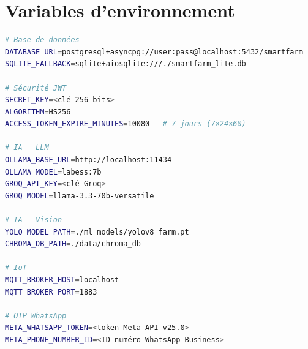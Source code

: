 \chapter{Variables d'environnement}
\label{ann:envvars}

\begin{lstlisting}[language=bash, caption={Variables d'environnement backend (.env)}]
# Base de données
DATABASE_URL=postgresql+asyncpg://user:pass@localhost:5432/smartfarm
SQLITE_FALLBACK=sqlite+aiosqlite:///./smartfarm_lite.db

# Sécurité JWT
SECRET_KEY=<clé 256 bits>
ALGORITHM=HS256
ACCESS_TOKEN_EXPIRE_MINUTES=10080   # 7 jours (7×24×60)

# IA - LLM
OLLAMA_BASE_URL=http://localhost:11434
OLLAMA_MODEL=labess:7b
GROQ_API_KEY=<clé Groq>
GROQ_MODEL=llama-3.3-70b-versatile

# IA - Vision
YOLO_MODEL_PATH=./ml_models/yolov8_farm.pt
CHROMA_DB_PATH=./data/chroma_db

# IoT
MQTT_BROKER_HOST=localhost
MQTT_BROKER_PORT=1883

# OTP WhatsApp
META_WHATSAPP_TOKEN=<token Meta API v25.0>
META_PHONE_NUMBER_ID=<ID numéro WhatsApp Business>
\end{lstlisting}

